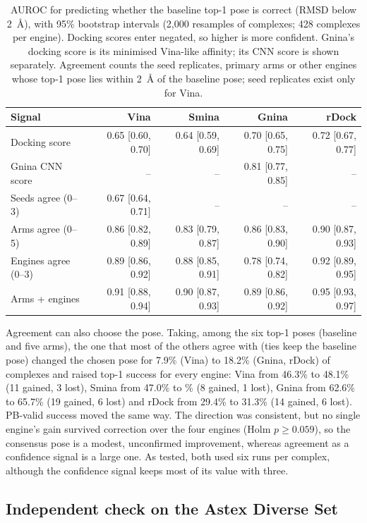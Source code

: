 \begin{table}[h]
  \centering
  \caption{AUROC for predicting whether the baseline top-1 pose is correct (RMSD below
    \SI{2}{\angstrom}), with 95\% bootstrap intervals (2,000 resamples of complexes; 428
    complexes per engine). Docking scores enter negated, so higher is more confident.
    Gnina's docking score is its minimised Vina-like affinity; its CNN score is shown
    separately. Agreement counts the seed replicates, primary arms or other engines whose
    top-1 pose lies within \SI{2}{\angstrom} of the baseline pose; seed replicates exist
    only for Vina.}
  \label{tab:agreement}
  \small
  \setlength{\tabcolsep}{4pt}
  \begin{tabular}{lrrrr}
    \toprule
    Signal & Vina & Smina & Gnina & rDock \\
    \midrule
    Docking score & 0.65 [0.60, 0.70] & 0.64 [0.59, 0.69] & 0.70 [0.65, 0.75] & 0.72 [0.67, 0.77] \\
    Gnina CNN score & -- & -- & 0.81 [0.77, 0.85] & -- \\
    Seeds agree (0--3) & 0.67 [0.64, 0.71] & -- & -- & -- \\
    Arms agree (0--5) & 0.86 [0.82, 0.89] & 0.83 [0.79, 0.87] & 0.86 [0.83, 0.90] & 0.90 [0.87, 0.93] \\
    Engines agree (0--3) & 0.89 [0.86, 0.92] & 0.88 [0.85, 0.91] & 0.78 [0.74, 0.82] & 0.92 [0.89, 0.95] \\
    Arms + engines & 0.91 [0.88, 0.94] & 0.90 [0.87, 0.93] & 0.89 [0.86, 0.92] & 0.95 [0.93, 0.97] \\
    \bottomrule
  \end{tabular}
\end{table}

Agreement can also choose the pose. Taking, among the six top-1 poses (baseline and five
arms), the one that most of the others agree with (ties keep the baseline pose) changed the
chosen pose for 7.9\% (Vina) to 18.2\% (Gnina, rDock) of complexes and raised top-1 success
for every engine: Vina from 46.3\% to 48.1\% (11 gained, 3 lost), Smina from 47.0\% to
\% (8 gained, 1 lost), Gnina from 62.6\% to 65.7\% (19 gained, 6 lost) and rDock from
29.4\% to 31.3\% (14 gained, 6 lost). PB-valid success moved the same way. The direction was
consistent, but no single engine's gain survived correction over the four engines (Holm
$p \ge 0.059$), so the consensus pose is a modest, unconfirmed improvement, whereas
agreement as a confidence signal is a large one. As tested, both used six runs per complex,
although the confidence signal keeps most of its value with three.

\subsection{Independent check on the Astex Diverse Set}
\label{sec:astex}

